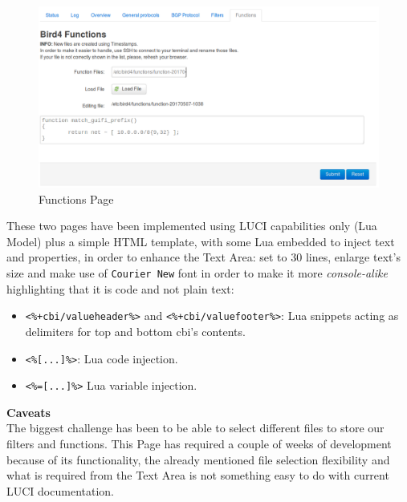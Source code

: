 \begin{figure}[H]
    \centering
    \includegraphics[width=\textwidth]{images/bird0.3/functions}
    \caption{Functions Page}
    \label{fig:functionsp}
\end{figure}

These two pages have been implemented using LUCI capabilities only (Lua Model) plus a simple HTML template, with some Lua embedded to inject text and properties, in order to enhance the Text Area: set to 30 lines, enlarge text's size and make use of \texttt{Courier New} font in order to make it more \textit{console-alike} highlighting that it is code and not plain text:



\begin{itemize}
    \item \texttt{<\%+cbi/valueheader\%>} and \texttt{<\%+cbi/valuefooter\%>}: Lua snippets acting as delimiters for top and bottom cbi's contents.
    \item \texttt{<\%[...]\%>}: Lua code injection.
    \item \texttt{<\%=[...]\%>} Lua variable injection.
\end{itemize}

\textbf{Caveats}\\
The biggest challenge has been to be able to select different files to store our filters and functions. This Page has required a couple of weeks of development because of its functionality, the already mentioned file selection flexibility and what is required from the Text Area is not something easy to do with current LUCI documentation.

